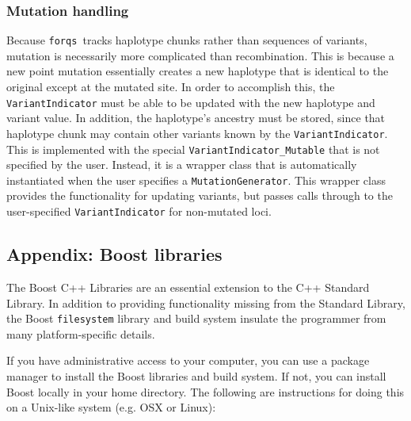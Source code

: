 \documentclass{article}
\newcommand{\forqs}[0]{\texttt{forqs }}
\begin{document}
\subsubsection{Mutation handling}

Because \forqs tracks haplotype chunks rather than sequences of variants,
mutation is necessarily more complicated than recombination.  This is because a
new point mutation essentially creates a new haplotype that is identical to the
original except at the mutated site.  In order to accomplish this, the
\texttt{VariantIndicator} must be able to be updated with the new haplotype and
variant value.  In addition, the haplotype's ancestry must be stored, since
that haplotype chunk may contain other variants known by the
\texttt{VariantIndicator}.  This is implemented with the special
\texttt{VariantIndicator\_Mutable} that is not specified by the user.  Instead,
it is a wrapper class that is automatically instantiated when the user
specifies a \texttt{MutationGenerator}.  This wrapper class provides the
functionality for updating variants, but passes calls through to the
user-specified \texttt{VariantIndicator} for non-mutated loci.




\subsection{Appendix: Boost libraries}

The Boost C++ Libraries are an essential extension to the C++ Standard Library.  
In addition to providing functionality missing from the Standard Library, the
Boost \texttt{filesystem} library and build system insulate the programmer from
many platform-specific details.

If you have administrative access to your computer, you can use a package
manager to install the Boost libraries and build system.  If not, you can
install Boost locally in your home directory.  The following are instructions
for doing this on a Unix-like system (e.g. OSX or Linux):
\end{document}
